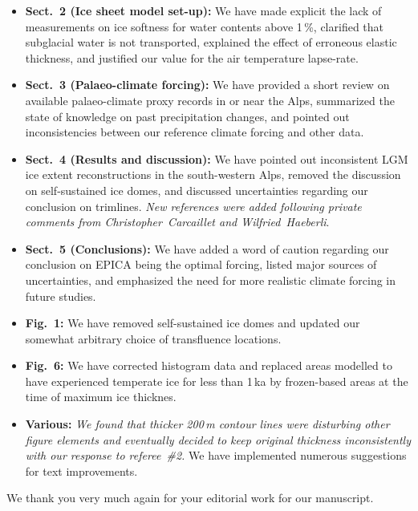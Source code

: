     \begin{itemize}

        \item \textbf{Sect.~2 (Ice sheet model set-up):}
        We have made explicit the lack of measurements on ice softness for
        water contents above 1\,\%, clarified that subglacial water is not
        transported, explained the effect of erroneous elastic thickness, and
        justified our value for the air temperature lapse-rate.

        \item \textbf{Sect.~3 (Palaeo-climate forcing):}
        We have provided a short review on available palaeo-climate proxy
        records in or near the Alps, summarized the state of knowledge on past
        precipitation changes, and pointed out inconsistencies between our
        reference climate forcing and other data.

        \item \textbf{Sect.~4 (Results and discussion):}
        We have pointed out inconsistent LGM ice extent reconstructions in the
        south-western Alps, removed the discussion on self-sustained ice domes,
        and discussed uncertainties regarding our conclusion on trimlines.
        \emph{New references were added following private comments from
              Christopher~Carcaillet and Wilfried~Haeberli}.

        \item \textbf{Sect.~5 (Conclusions):}
        We have added a word of caution regarding our conclusion on EPICA being
        the optimal forcing, listed major sources of uncertainties, and
        emphasized the need for more realistic climate forcing in future
        studies.

        \item \textbf{Fig.~1:}
        We have removed self-sustained ice domes and updated our somewhat
        arbitrary choice of transfluence locations.

        \item \textbf{Fig.~6:}
        We have corrected histogram data and replaced areas modelled to have
        experienced temperate ice for less than 1\,ka by frozen-based areas
        at the time of maximum ice thicknes.

        \item \textbf{Various:}
        \emph{We found that thicker 200\,m contour lines were disturbing other
              figure elements and eventually decided to keep original thickness
              inconsistently with our response to referee~\#2.}
        We have implemented numerous suggestions for text improvements.

    \end{itemize}

    We thank you very much again for your editorial work for our manuscript.


